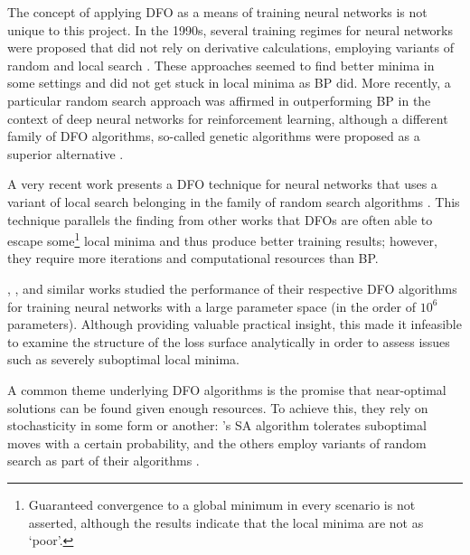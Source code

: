 The concept of applying DFO as a means of training neural networks is not unique to this project.
In the 1990s, several training regimes for neural networks were proposed that did not rely on derivative calculations, employing variants of random and local search \cite{hirasawa1998,battiti1995}.
These approaches seemed to find better minima in some settings and did not get stuck in local minima as BP did. 
More recently, a particular random search approach was affirmed in outperforming BP in the context of deep neural networks for reinforcement learning, although a different family of DFO algorithms, so-called genetic algorithms were proposed as a superior alternative \cite{such2017}.

A very recent work presents a DFO technique for neural networks that uses a variant of local search belonging in the family of random search algorithms \cite{aly2019}.
This technique parallels the finding from other works that DFOs are often able to escape some\footnote{Guaranteed convergence to a global minimum in every scenario is not asserted, although the results indicate that the local minima are not as `poor'.} local minima and thus produce better training results; however, they require more iterations and computational resources than BP. 

\citeauthor{aly2019}, \citeauthor{such2017}, and similar works studied the performance of their respective DFO algorithms for training neural networks with a large parameter space (in the order of $10^6$ parameters).
Although providing valuable practical insight, this made it infeasible to examine the structure of the loss surface analytically in order to assess issues such as severely suboptimal local minima.

A common theme underlying DFO algorithms is the promise that near-optimal solutions can be found given enough resources. 
To achieve this, they rely on stochasticity in some form or another: 
\citeauthor{kirkpatrick1983}'s SA algorithm tolerates suboptimal moves with a certain probability, and the others employ variants of random search as part of their algorithms \cite{hirasawa1998,battiti1995,aly2019,such2017}.


